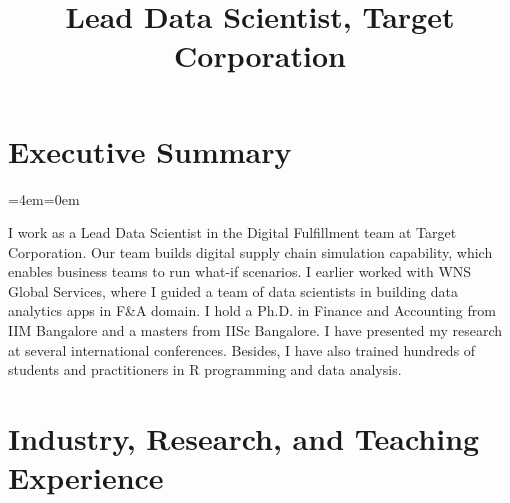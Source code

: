 \documentclass[11pt,a4paper,]{moderncv}
\title{Lead Data Scientist, Target Corporation}
\begin{document}
\makecvtitle



\newenvironment{smallblockquote}{%
  \par%
  \medskip
  \leftskip=2em\rightskip=0em%
  \noindent\ignorespaces}{%
  \par\medskip}

\newenvironment{blockquote}{%
  \par%
  \medskip
  \leftskip=4em\rightskip=0em%
  \noindent\ignorespaces}{%
  \par\medskip}

\hypertarget{executive-summary}{%
\section{Executive Summary}\label{executive-summary}}

\begingroup
%
  \par%
  \medskip
  \leftskip=4em\rightskip=0em%
  \noindent\ignorespaces

I work as a Lead Data Scientist in the Digital Fulfillment team at Target Corporation. Our team builds digital supply chain simulation capability, which enables business teams to run what-if scenarios. I earlier worked with WNS Global Services, where I guided a team of data scientists in building data analytics apps in F\&A domain. I hold a Ph.D. in Finance and Accounting from IIM Bangalore and a masters from IISc Bangalore. I have presented my research at several international conferences. Besides, I have also trained hundreds of students and practitioners in R programming and data analysis.

%
  \par\medskip
\endgroup

\hypertarget{industry-research-and-teaching-experience}{%
\section{Industry, Research, and Teaching
Experience}\label{industry-research-and-teaching-experience}}
\end{document}
